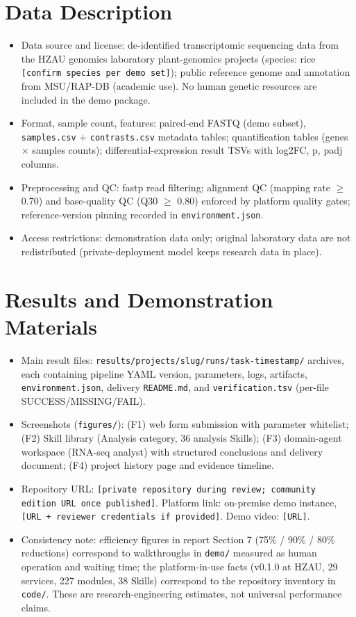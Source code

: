 \documentclass[11pt,a4paper]{article}
\begin{document}
\section{Data Description}
\begin{itemize}
  \item Data source and license: de-identified transcriptomic sequencing data from the HZAU genomics laboratory plant-genomics projects (species: rice \texttt{[confirm species per demo set]}); public reference genome and annotation from MSU/RAP-DB (academic use). No human genetic resources are included in the demo package.
  \item Format, sample count, features: paired-end FASTQ (demo subset), \texttt{samples.csv} + \texttt{contrasts.csv} metadata tables; quantification tables (genes $\times$ samples counts); differential-expression result TSVs with log2FC, p, padj columns.
  \item Preprocessing and QC: fastp read filtering; alignment QC (mapping rate $\geq$ 0.70) and base-quality QC (Q30 $\geq$ 0.80) enforced by platform quality gates; reference-version pinning recorded in \texttt{environment.json}.
  \item Access restrictions: demonstration data only; original laboratory data are not redistributed (private-deployment model keeps research data in place).
\end{itemize}

\section{Results and Demonstration Materials}
\begin{itemize}
  \item Main result files: \texttt{results/projects/\textlangle slug\textrangle /runs/\textlangle task\textrangle -\textlangle timestamp\textrangle /} archives, each containing pipeline YAML version, parameters, logs, artifacts, \texttt{environment.json}, delivery \texttt{README.md}, and \texttt{verification.tsv} (per-file SUCCESS/MISSING/FAIL).
  \item Screenshots (\texttt{figures/}): (F1) web form submission with parameter whitelist; (F2) Skill library (Analysis category, 36 analysis Skills); (F3) domain-agent workspace (RNA-seq analyst) with structured conclusions and delivery document; (F4) project history page and evidence timeline.
  \item Repository URL: \texttt{[private repository during review; community edition URL once published]}. Platform link: on-premise demo instance, \texttt{[URL + reviewer credentials if provided]}. Demo video: \texttt{[URL]}.
  \item Consistency note: efficiency figures in report Section 7 (75\% / 90\% / 80\% reductions) correspond to walkthroughs in \texttt{demo/} measured as human operation and waiting time; the platform-in-use facts (v0.1.0 at HZAU, 29 services, 227 modules, 38 Skills) correspond to the repository inventory in \texttt{code/}. These are research-engineering estimates, not universal performance claims.
\end{itemize}
\end{document}
